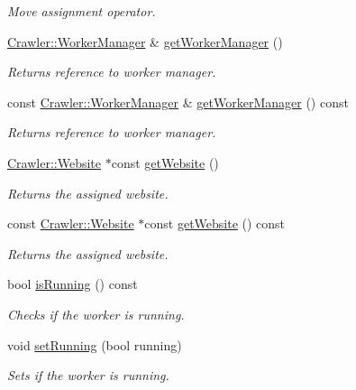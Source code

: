 \begin{DoxyCompactItemize}
\begin{DoxyCompactList}\small\item\em Move assignment operator. \end{DoxyCompactList}\item 
\hyperlink{class_crawler_1_1_worker_manager}{Crawler\+::\+Worker\+Manager} \& \hyperlink{class_crawler_1_1_worker_abd9a803c234ccb0cf90c692e99186392}{get\+Worker\+Manager} ()
\begin{DoxyCompactList}\small\item\em Returns reference to worker manager. \end{DoxyCompactList}\item 
const \hyperlink{class_crawler_1_1_worker_manager}{Crawler\+::\+Worker\+Manager} \& \hyperlink{class_crawler_1_1_worker_a9b928f1df164a8bae91fb4805ff8721f}{get\+Worker\+Manager} () const 
\begin{DoxyCompactList}\small\item\em Returns reference to worker manager. \end{DoxyCompactList}\item 
\hyperlink{class_crawler_1_1_website}{Crawler\+::\+Website} $\ast$const \hyperlink{class_crawler_1_1_worker_a8cffde69eb4e98a721f7166f16e51c07}{get\+Website} ()
\begin{DoxyCompactList}\small\item\em Returns the assigned website. \end{DoxyCompactList}\item 
const \hyperlink{class_crawler_1_1_website}{Crawler\+::\+Website} $\ast$const \hyperlink{class_crawler_1_1_worker_ae80bb21bbaf941125b39a17193996207}{get\+Website} () const 
\begin{DoxyCompactList}\small\item\em Returns the assigned website. \end{DoxyCompactList}\item 
bool \hyperlink{class_crawler_1_1_worker_a11a0ead3241c79dc248622301ec01aab}{is\+Running} () const 
\begin{DoxyCompactList}\small\item\em Checks if the worker is running. \end{DoxyCompactList}\item 
void \hyperlink{class_crawler_1_1_worker_a1de3b4fa459824a29d191ab7938fceb6}{set\+Running} (bool running)
\begin{DoxyCompactList}\small\item\em Sets if the worker is running. \end{DoxyCompactList}\item 

\end{DoxyCompactItemize}

